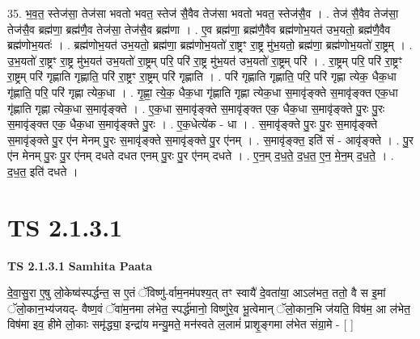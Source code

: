 \documentclass[17pt]{extarticle}
\begin{document}
35. भ॒व॒त॒ स्तेज॑सा॒ तेज॑सा भवतो भवत॒ स्तेज॑ सै॒वैव तेज॑सा भवतो भवत॒ स्तेज॑सै॒व । . तेज॑ सै॒वैव तेज॑सा॒ तेज॑सै॒व ब्रह्म॑णा॒ ब्रह्म॑णै॒व तेज॑सा॒ तेज॑सै॒व ब्रह्म॑णा । . ए॒व ब्रह्म॑णा॒ ब्रह्म॑णै॒वैव ब्रह्म॑णोभ॒यत॑ उभ॒यतो॒ ब्रह्म॑णै॒वैव ब्रह्म॑णोभ॒यतः॑ । . ब्रह्म॑णोभ॒यत॑ उभ॒यतो॒ ब्रह्म॑णा॒ ब्रह्म॑णोभ॒यतो॑ रा॒ष्ट्रꣳ रा॒ष्ट्र मु॑भ॒यतो॒ ब्रह्म॑णा॒ ब्रह्म॑णोभ॒यतो॑ रा॒ष्ट्रम् । . उ॒भ॒यतो॑ रा॒ष्ट्रꣳ रा॒ष्ट्र मु॑भ॒यत॑ उभ॒यतो॑ रा॒ष्ट्रम् परि॒ परि॑ रा॒ष्ट्र मु॑भ॒यत॑ उभ॒यतो॑ रा॒ष्ट्रम् परि॑ । . रा॒ष्ट्रम् परि॒ परि॑ रा॒ष्ट्रꣳ रा॒ष्ट्रम् परि॑ गृह्णाति गृह्णाति॒ परि॑ रा॒ष्ट्रꣳ रा॒ष्ट्रम् परि॑ गृह्णाति । . परि॑ गृह्णाति गृह्णाति॒ परि॒ परि॑ गृह्णा त्येक॒ धैक॒धा गृ॑ह्णाति॒ परि॒ परि॑ गृह्णा त्येक॒धा । . गृ॒ह्णा॒ त्ये॒क॒ धैक॒धा गृ॑ह्णाति गृह्णा त्येक॒धा स॒मावृ॑ङ्क्ते स॒मावृ॑ङ्क्त एक॒धा गृ॑ह्णाति गृह्णा त्येक॒धा स॒मावृ॑ङ्क्ते । . ए॒क॒धा स॒मावृ॑ङ्क्ते स॒मावृ॑ङ्क्त एक॒ धैक॒धा स॒मावृ॑ङ्क्ते पु॒रः पु॒रः स॒मावृ॑ङ्क्त एक॒ धैक॒धा स॒मावृ॑ङ्क्ते पु॒रः । . ए॒क॒धेत्ये॑क - धा । . स॒मावृ॑ङ्क्ते पु॒रः पु॒रः स॒मावृ॑ङ्क्ते स॒मावृ॑ङ्क्ते पु॒र ए॑न मेनम् पु॒रः स॒मावृ॑ङ्क्ते 
स॒मावृ॑ङ्क्ते पु॒र ए॑नम् । . स॒मावृ॑ङ्क्त॒ इति॑ सं - आवृ॑ङ्क्ते । . पु॒र ए॑न मेनम् पु॒रः पु॒र ए॑नम् दधते दधत एनम् पु॒रः पु॒र ए॑नम् दधते । . ए॒न॒म् द॒ध॒ते॒ द॒ध॒त॒ ए॒न॒ मे॒न॒म् द॒ध॒ते॒ । . द॒ध॒त॒ इति॑ दधते । \newline
\pagebreak
{}
\section*{ TS 2.1.3.1 }

\textbf{TS 2.1.3.1 } \newline
\textbf{Samhita Paata} \newline

दे॒वा॒सु॒रा ए॒षु लो॒केष्व॑स्पर्द्धन्त॒ स ए॒तं ॅविष्णु॑-र्वाम॒नम॑पश्य॒त् तꣳ स्वायै॑ दे॒वता॑या॒ आऽल॑भत॒ ततो॒ वै स इ॒मां ॅलो॒कान॒भ्य॑जयद्- वैष्ण॒वं ॅवा॑म॒नमा ल॑भेत॒ स्पर्द्ध॑मानो॒ विष्णु॑रे॒व भू॒त्वेमान् ॅलो॒कान॒भि ज॑यति॒ विष॑म॒ आ ल॑भेत॒ विष॑मा इव॒ हीमे लो॒काः समृ॑द्ध्या॒ इन्द्रा॑य मन्यु॒मते॒ मन॑स्वते ल॒लामं॑ प्राशृ॒ङ्गमा ल॑भेत संग्रा॒मे - [  ] \newline
\end{document}
